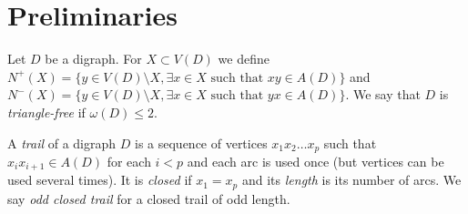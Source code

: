 
\section{Preliminaries}


Let $D$ be a digraph. 
For $X\subset V(D)$ we define $N^+(X)=\{y\in V(D)\setminus X, \exists x\in X \text{ such that } xy\in A(D)\}$ and $
N^-(X)=\{y\in V(D)\setminus X, \exists x\in X \text{ such that } yx\in A(D)\}$.
We say that $D$ is  {\em triangle-free} if $\omega(D) \leq 2$. 

A {\em trail} of a digraph $D$ is a sequence of vertices $x_1x_2\ldots x_p$ such that $x_ix_{i+1}\in A(D)$ for each $i<p$ and each arc is used once (but vertices can be used several times). 
It is \emph{closed} if $x_1 = x_p$ and its {\em length} is its number of arcs. We say {\em odd closed trail} for a closed trail of odd length. 





